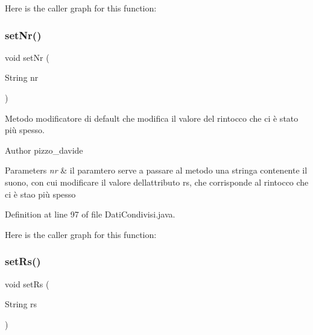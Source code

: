 Here is the caller graph for this function\+:
\mbox{\label{classcampane_1_1_dati_condivisi_a7279779585b56f536bb0e0cb30d07046}} 
\subsubsection{\texorpdfstring{set\+Nr()}{setNr()}}
{\footnotesize\ttfamily void set\+Nr (\begin{DoxyParamCaption}\item[{String}]{nr }\end{DoxyParamCaption})}



Metodo modificatore di default che modifica il valore del rintocco che ci è stato più spesso. 

\begin{DoxyAuthor}{Author}
pizzo\+\_\+davide
\end{DoxyAuthor}

\begin{DoxyParams}{Parameters}
{\em nr} & il paramtero serve a passare al metodo una stringa contenente il suono, con cui modificare il valore dell\textquotesingle{}attributo rs, che corrisponde al rintocco che ci è stao più spesso \\
\hline
\end{DoxyParams}


Definition at line 97 of file Dati\+Condivisi.\+java.

Here is the caller graph for this function\+:
\mbox{\label{classcampane_1_1_dati_condivisi_a2dbdf2681bac5f1e5628fb145daa119d}} 
\subsubsection{\texorpdfstring{set\+Rs()}{setRs()}}
{\footnotesize\ttfamily void set\+Rs (\begin{DoxyParamCaption}\item[{String}]{rs }\end{DoxyParamCaption})}




